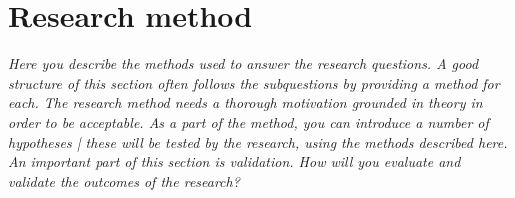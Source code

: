 \chapter{Research method}
\emph{Here you describe the methods used to answer the research questions. A good
structure of this section often follows the subquestions by providing a method for each. The
research method needs a thorough motivation grounded in theory in order to be acceptable.
As a part of the method, you can introduce a number of hypotheses | these will be tested by
the research, using the methods described here. An important part of this section is validation.
How will you evaluate and validate the outcomes of the research?}
